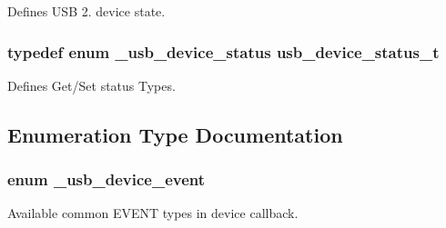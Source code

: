Defines U\-S\-B 2. device state. 

\hypertarget{group__usb__device__driver_ga11ab1b56db153ac62eecf01661216bbf}{
\subsubsection[{usb\-\_\-device\-\_\-status\-\_\-t}]{\setlength{\rightskip}{0pt plus 5cm}typedef enum {\bf \-\_\-usb\-\_\-device\-\_\-status}  {\bf usb\-\_\-device\-\_\-status\-\_\-t}}}\label{group__usb__device__driver_ga11ab1b56db153ac62eecf01661216bbf}


Defines Get/\-Set status Types. 



\subsection{Enumeration Type Documentation}
\hypertarget{group__usb__device__driver_gac66a5e6b9c677f9d8d4f782aa62df540}{
\subsubsection[{\-\_\-usb\-\_\-device\-\_\-event}]{\setlength{\rightskip}{0pt plus 5cm}enum {\bf \-\_\-usb\-\_\-device\-\_\-event}}}\label{group__usb__device__driver_gac66a5e6b9c677f9d8d4f782aa62df540}


Available common E\-V\-E\-N\-T types in device callback. 

